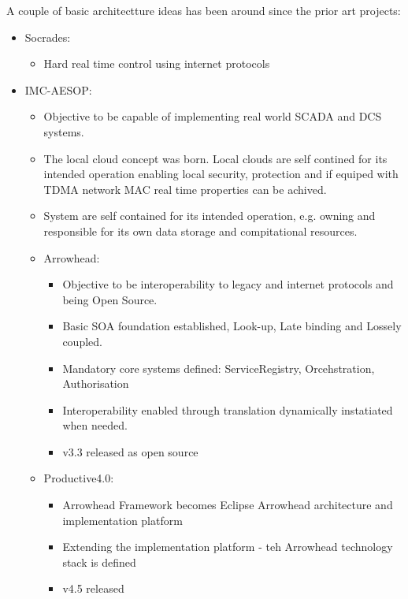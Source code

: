 \documentclass[a4paper]{arrowhead}
\begin{document}
A couple of basic architectture ideas has been around since the prior
art projects:
\begin{itemize}
\item Socrades:
  \begin{itemize}
  \item Hard real time control using internet protocols
  \end{itemize}

\item IMC-AESOP:
  \begin{itemize}
  \item Objective to be capable of implementing real world SCADA and
    DCS systems.
  \item The local cloud concept was born. Local clouds are self
    contined for its intended operation enabling local security,
    protection and if equiped with TDMA network MAC real time
    properties can be achived.
  \item System are self contained for its intended operation,
    e.g. owning and responsible for its own data storage and compitational resources.

  \item Arrowhead:
    \begin{itemize}
    \item Objective to be interoperability to legacy and internet protocols and being
      Open Source.
    \item Basic SOA foundation established, Look-up, Late binding and
      Lossely coupled.
    \item Mandatory core systems defined: ServiceRegistry,
      Orcehstration, Authorisation
    \item Interoperability enabled through translation dynamically
      instatiated when needed.
    \item v3.3 released as open source      
    \end{itemize}
  
    \item Productive4.0:
      \begin{itemize}
      \item Arrowhead Framework becomes Eclipse Arrowhead architecture
        and implementation platform
      \item Extending the implementation platform - teh Arrowhead
        technology stack is defined
      \item v4.5 released
      \end{itemize}


\end{itemize}
\end{itemize}
\end{document}
